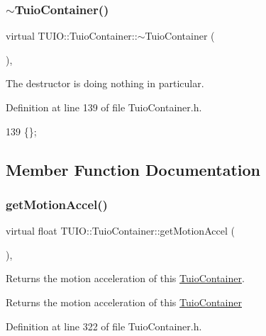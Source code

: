 \subsubsection{\texorpdfstring{$\sim$\+Tuio\+Container()}{~TuioContainer()}}
{\footnotesize\ttfamily virtual T\+U\+I\+O\+::\+Tuio\+Container\+::$\sim$\+Tuio\+Container (\begin{DoxyParamCaption}{ }\end{DoxyParamCaption})\hspace{0.3cm}{\ttfamily [inline]}, {\ttfamily [virtual]}}

The destructor is doing nothing in particular. 

Definition at line 139 of file Tuio\+Container.\+h.


\begin{DoxyCode}
139 \{\};
\end{DoxyCode}


\subsection{Member Function Documentation}
\mbox{\label{class_t_u_i_o_1_1_tuio_container_ac2a47a96b789844909b2fffd17a63f36}} 
\subsubsection{\texorpdfstring{get\+Motion\+Accel()}{getMotionAccel()}}
{\footnotesize\ttfamily virtual float T\+U\+I\+O\+::\+Tuio\+Container\+::get\+Motion\+Accel (\begin{DoxyParamCaption}{ }\end{DoxyParamCaption})\hspace{0.3cm}{\ttfamily [inline]}, {\ttfamily [virtual]}}

Returns the motion acceleration of this \hyperlink{class_t_u_i_o_1_1_tuio_container}{Tuio\+Container}. \begin{DoxyReturn}{Returns}
the motion acceleration of this \hyperlink{class_t_u_i_o_1_1_tuio_container}{Tuio\+Container} 
\end{DoxyReturn}


Definition at line 322 of file Tuio\+Container.\+h.



